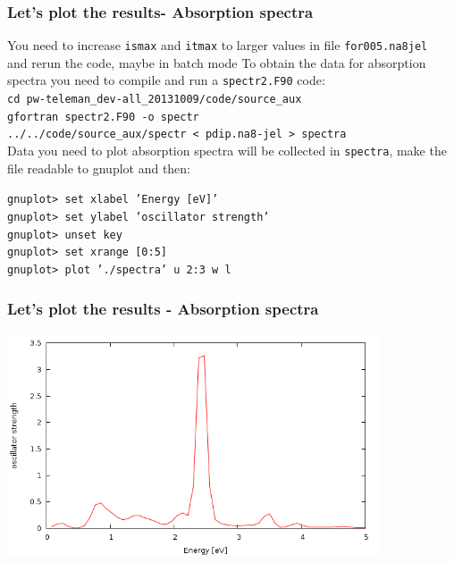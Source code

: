 \documentclass[10pt]{beamer}
\begin{document}
\begin{frame}
\frametitle{Let's plot the results- Absorption spectra}
You need to increase {\tt ismax}  and {\tt itmax}  to larger values in file  {\tt for005.na8jel  } 
and rerun the code, maybe  in batch mode 
To obtain the data for absorption spectra you need to compile and run a {\tt spectr2.F90} code:\\
\vspace*{0.2cm}
{\tt cd pw-teleman\_dev-all\_20131009/code/source\_aux}\\
\vspace*{0.1cm}
{\tt gfortran spectr2.F90 -o spectr}\\
\vspace*{0.1cm}
{\tt ../../code/source\_aux/spectr < pdip.na8-jel > spectra}\\
\vspace*{0.2cm}
Data you need to plot absorption spectra will be collected in {\tt spectra}, make the file readable to gnuplot and then:\\
\vspace*{0.2cm}

{\tt gnuplot> set xlabel 'Energy [eV]'\\
gnuplot> set ylabel 'oscillator strength'\\
gnuplot> unset key \\
gnuplot>  set xrange [0:5]\\
gnuplot>  plot './spectra' u 2:3 w l
}\\
  
\end{frame}




\begin{frame}
\frametitle{Let's plot the results - Absorption spectra}

\centering
 \includegraphics[width=11cm]{fig/spectr}



   
\end{frame}
\end{document}
